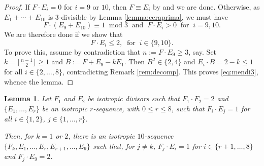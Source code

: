 \documentclass[11pt]{amsart}
\newtheorem{lemma}[thm]{Lemma}
\theoremstyle{definition}
\def\mod{\operatorname{mod}}
\begin{document}
\begin{proof}
 If $F \cdot E_i=0$ for $i=9$ or $10$, then $F \equiv E_i$ by \cite[Lemma 2.1]{klvan} and we are done. Otherwise, as
$E_1 +\cdots+E_{10}$ is $3$-divisible by Lemma \ref{lemma:ceraprima}, we must have 
 \[
  F \cdot (E_9+E_{10}) \equiv 1 \; \mod 3 \; \; \mbox{and} \; \; F \cdot E_i>0 \; \;  \mbox{for}\; \;  i=9,10.
\]
We are therefore done if we show that 
\begin{equation}
  \label{eq:mendi3}
  F \cdot E_i \leqslant 2, \; \; \mbox{for} \; \; i \in \{9,10\}.
\end{equation}
To prove this, assume by contradiction that $n:=F \cdot E_9 \geqslant 3$, say. Set
$k= \lfloor \frac{n-1}{2} \rfloor \geqslant 1$ and $B:=F+E_9-kE_1$. Then $B^2 \in \{2,4\}$ and $E_i \cdot B=2-k \leqslant 1$ for all $i \in \{2,\ldots,8\}$, contradicting Remark \ref{rem:decomp}. This proves \eqref{eq:mendi3}, whence the lemma.
\end{proof}

\begin{lemma} \label{lemma:ext2}
  Let $F_1$ and $F_2$ be isotropic divisors such  that  $F_1 \cdot F_2=2$ and $\{E_1,\ldots,E_r\}$ be an isotropic $r$-sequence, with $0 \leqslant r \leqslant 8$, such that $F_i \cdot E_j=1$ for all $i \in \{1,2\}$, $j \in \{1,\ldots,r\}$. 
  
  Then, for $k=1$ or $2$, there is an isotropic $10$-sequence $\{F_k,E_1,\ldots,E_r,E_{r+1},\ldots,E_9\}$ such that, for $j \neq k$, $F_j \cdot E_i=1$ for $i \in\{r+1,\ldots,8\}$ and $F_j \cdot E_9=2$. 
\end{lemma}
\end{document}
